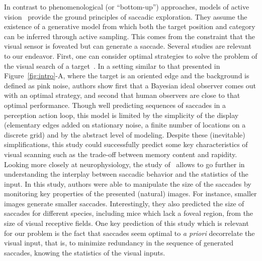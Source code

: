 In contrast to phenomenological (or ``bottom-up'') approaches, models of active vision~\citep{Najemnik05,Butko2010infomax,Friston12} provide the ground principles of saccadic exploration. They assume the existence of a generative model from which both the target position and category can be inferred through active sampling. This comes from the constraint that the visual sensor is foveated but can generate a saccade. 
Several studies are relevant to our endeavor. First, one can consider optimal strategies to solve the problem of the visual search of a target~\citep{Najemnik05}. In a setting similar to that presented in Figure~\ref{fig:intro}-A, where the target is an oriented edge and the background is defined as pink noise, authors show first that a Bayesian ideal observer comes out with an optimal strategy, and second that human observers are close to that optimal performance. Though well predicting sequences of saccades in a perception action loop, this model is limited by the simplicity of the display (elementary edges added on stationary noise, a finite number of locations on a discrete grid) and by the abstract level of modeling. Despite these (inevitable) simplifications, this study could successfully predict some key characteristics of visual scanning such as the trade-off between memory content and rapidity. Looking more closely at neurophysiology, the study of~\citep{Samonds18} allows to go further in understanding the interplay between saccadic behavior and the statistics of the input. In this study, authors were able to manipulate the size of the saccades by monitoring key properties of the presented (natural) images. For instance, smaller images generate smaller saccades. Interestingly, they also predicted the size of saccades for different species, including mice which lack a foveal region, from the size of visual receptive fields. One key prediction of this study which is relevant for our problem is the fact that saccades seem optimal to \emph{a priori} decorrelate the visual input, that is, to minimize redundancy in the sequence of generated saccades, knowing the statistics of the visual inputs.

